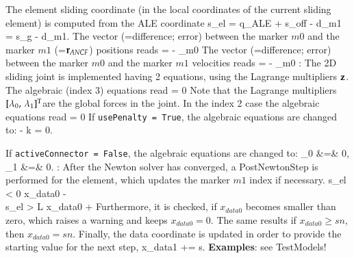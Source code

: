     The element sliding coordinate (in the local coordinates of the current sliding element) is computed from the ALE coordinate
    \be
      s_{el} = q_{ALE} + s_{off} - d_{m1} = s_g - d_{m1}.
    \ee
    The vector (=difference; error) between the marker $m0$ and the marker $m1$ (=$\mathbf{r}_{ANCF}$) positions reads
    \be
       =  - _{m0}
    \ee
    The vector (=difference; error) between the marker $m0$ and the marker $m1$ velocities reads
    \be
       =  - _{m0}
    \ee
%
    :
    The 2D sliding joint is implemented having 2 equations, using the Lagrange multipliers $\mathbf{z}$. 
    The algebraic (index 3) equations read
    \be
       = 0
    \ee
    Note that the Lagrange multipliers $[\lambda_0,\,\lambda_1]^\mathrm{T}$are the global forces in the joint.
    In the index 2 case the algebraic equations read
    \be
       = 0
    \ee
    If \texttt{usePenalty = True}, the algebraic equations are changed to:
    \be
       -  k \zv = 0.
    \ee
%

    \noindent If \texttt{activeConnector = False}, the algebraic equations are changed to:
    \bea
      \lambda_0 &=& 0,   \\
      \lambda_1 &=& 0.
    \eea   
%
    :
    After the Newton solver has converged, a PostNewtonStep is performed for the element, which
    updates the marker $m1$ index if necessary.
    \bea
      s_{el} < 0 \quad \ra \quad x_{data0} \;-\! \nonumber\\
      s_{el} > L \quad \ra \quad x_{data0} \;+\!
    \eea
    Furthermore, it is checked, if $x_{data0}$ becomes smaller than zero, which raises a warning and keeps $x_{data0}=0$.
    The same results if $x_{data0}\ge sn$, then $x_{data0} = sn$.
    Finally, the data coordinate is updated in order to provide the starting value for the next step,
    \be
      x_{data1} \;+\!\!= s.
    \ee
%
    {\bf Examples}: see TestModels!


